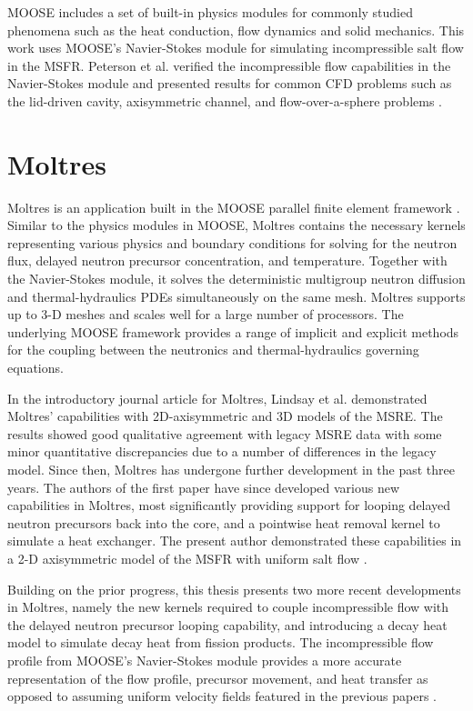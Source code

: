 \gls{MOOSE} includes a set of built-in physics modules for commonly studied
phenomena such as the heat conduction, flow dynamics and solid mechanics. This
work uses \gls{MOOSE}'s Navier-Stokes module for simulating
incompressible salt flow in the \gls{MSFR}. Peterson et al. verified the
incompressible flow capabilities in the
Navier-Stokes module and presented results for common \gls{CFD} problems such
as the lid-driven cavity, axisymmetric channel, and flow-over-a-sphere
problems \cite{peterson_overview_2017}. 

\section{Moltres}

Moltres is an application built in the \gls{MOOSE} parallel finite element
framework \cite{lindsay_introduction_2018}. Similar to the physics modules in
\gls{MOOSE}, Moltres contains the necessary kernels representing various
physics and boundary conditions for solving for the neutron flux, delayed
neutron precursor concentration, and temperature. Together with the
Navier-Stokes module, it solves
the deterministic multigroup neutron diffusion and thermal-hydraulics
\glspl{PDE} simultaneously on the same mesh. Moltres supports up to 3-D meshes
and scales well for a large number of processors. The underlying \gls{MOOSE}
framework provides a range of implicit and explicit methods for the coupling
between the neutronics and thermal-hydraulics governing equations.

In the introductory journal article for Moltres, Lindsay et al.
\cite{lindsay_introduction_2018} demonstrated Moltres' capabilities with
2D-axisymmetric and 3D models of the \gls{MSRE}. The results showed good
qualitative agreement with legacy \gls{MSRE} data with some minor
quantitative discrepancies due to a number of differences in the legacy model. 
Since then, Moltres has undergone further development in the past three years.
The authors of the first paper have since developed various new capabilities
in Moltres, most significantly providing support for looping delayed neutron
precursors back into the core, and a pointwise heat removal kernel to simulate
a heat exchanger. The present author demonstrated these capabilities in a
2-D axisymmetric model of the \gls{MSFR} with uniform salt flow
\cite{park_safety_2019}. 

Building on the prior progress, this thesis presents two more recent
developments in Moltres, namely the new kernels required to couple
incompressible flow with the delayed neutron precursor looping capability, and
introducing a decay heat model to simulate decay heat from fission products.
The incompressible flow profile from \gls{MOOSE}'s Navier-Stokes module
provides a more accurate representation of the flow profile, precursor
movement, and heat transfer as opposed to assuming uniform velocity fields
featured in the previous papers \cite{lindsay_introduction_2018,
park_safety_2019}.

